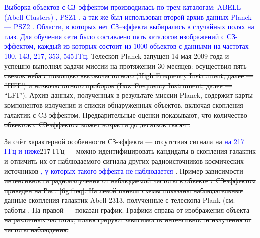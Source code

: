 \documentclass[
aps,%
12pt,%
final,%
notitlepage,%
oneside,%
onecolumn,%
nobibnotes,%
nofootinbib,%
superscriptaddress,%
noshowpacs,%
centertags]%
{revtex4}
\begin{document}
\textcolor{blue}{Выборка объектов с СЗ--эффектом производилась по трем каталогам: ABELL (Abell Clusters) \cite{Abell}, PSZ1 \cite{Planck1}, а так же был использован второй архив данных Planck --- PSZ2 \cite{Planck2}. Области, в которых нет СЗ--эффекта выбирались в случайных полях на глаз. Для обучения сети было составлено пять каталогов изображений с CЗ-эффектом, каждый из которых состоит из $1 000$ объектов с данными на частотах 100, 143, 217, 353, 545\,ГГц.}
\sout{Телескоп Planck запущен 14 мая 2009 года и успешно выполнял задачи миссии на протяжении 30 месяцев: осуществил пять съемок неба с помощью высокочастотного (High Frequency Instrument, далее --- ``HFI'') и низкочастотного приборов (Low Frequency Instrument, далее --- ``LFI''). Архив данных, полученных в результате миссии Planck, содержит карты компонентов излучения и списки обнаруженных объектов, включая скопления галактик с CЗ-эффектом. Предварительные оценки показывают, что количество объектов с CЗ-эффектом может возрасти до десятков тысяч \cite{Planck1, Planck2}.}

За счёт характерной особенности СЗ-эффекта --- отсутствия сигнала на \textcolor{blue}{на 217 ГГц и ниже}\sout{217 ГГц} --- можно идентифицировать кандидаты в скопления галактик и отличить их от \sout{наблюдаемого} сигнала других радиоисточников \sout{космических источников} \textcolor{blue}{, у которых такого эффекта не наблюдается \cite{Planck2}}. \sout{Пример зависимости интенсивности радиоизлучения от наблюдаемой частоты в объекте с СЗ-эффектом приведен на Рис.~\ref{fig:freq}. На левой панели схемы показаны наблюдательные данные скопления галактик Abell 2313, полученные с телескопа Plank (см. работы \cite{Abell, Planck1, Planck2}. На правой --- показан график. Графики справа от изображения объекта на различных частотах, иллюстрируют зависимость интенсивности излучения от частоты наблюдения.}

\end{document}
